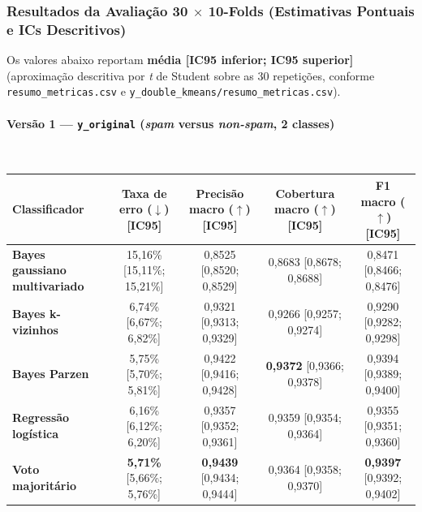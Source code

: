 \documentclass[a4paper,11pt]{article}
\begin{document}
\subsubsection{\texorpdfstring{Resultados da Avaliação 30 $\times$ 10-Folds (Estimativas Pontuais e ICs Descritivos)}{Resultados da Avaliação 30 x 10-Folds (Estimativas Pontuais e ICs Descritivos)}}\label{sec:2-3-3-resultados-da-avaliacao-30-10-folds-estimativas-pontuais-e-ics-descritivos}


Os valores abaixo reportam \textbf{média [IC95 inferior; IC95 superior]} (aproximação descritiva por \textit{t} de Student sobre as $30$ repetições, conforme \texttt{resumo\_\allowbreak metricas.csv} e \texttt{y\_\allowbreak double\_\allowbreak kmeans/\allowbreak resumo\_\allowbreak metricas.csv}).

\paragraph{\texorpdfstring{Versão 1 --- \texttt{y\_original} (\textit{spam} versus \textit{non-spam}, 2 classes)}{Versão 1 - yoriginal (spam versus non-spam, 2 classes)}}\mbox{}\\[-0.2em]\label{sec:versao-1-yoriginal-spam-versus-non-spam-2-classes}


\begin{center}
\begin{minipage}{\linewidth}
\centering
{}
\footnotesize
\sloppy
\setlength{\tabcolsep}{2.5pt}
\renewcommand{\arraystretch}{1.18}
\begin{tabularx}{\linewidth}{P{2.55cm} C C C C}
\toprule
\textbf{Classificador} & \textbf{Taxa de erro ($\downarrow$) [IC95]} & \textbf{Precisão macro ($\uparrow$) [IC95]} & \textbf{Cobertura macro ($\uparrow$) [IC95]} & \textbf{F1 macro ($\uparrow$) [IC95]} \\
\midrule
\textbf{Bayes gaussiano multivariado} & 15,16\% [15,11\%; 15,21\%] & 0,8525 [0,8520; 0,8529] & 0,8683 [0,8678; 0,8688] & 0,8471 [0,8466; 0,8476] \\
\textbf{Bayes k-vizinhos} & 6,74\% [6,67\%; 6,82\%] & 0,9321 [0,9313; 0,9329] & 0,9266 [0,9257; 0,9274] & 0,9290 [0,9282; 0,9298] \\
\textbf{Bayes Parzen} & 5,75\% [5,70\%; 5,81\%] & 0,9422 [0,9416; 0,9428] & \textbf{0,9372} [0,9366; 0,9378] & 0,9394 [0,9389; 0,9400] \\
\textbf{Regressão logística} & 6,16\% [6,12\%; 6,20\%] & 0,9357 [0,9352; 0,9361] & 0,9359 [0,9354; 0,9364] & 0,9355 [0,9351; 0,9360] \\
\textbf{Voto majoritário} & \textbf{5,71\%} [5,66\%; 5,76\%] & \textbf{0,9439} [0,9434; 0,9444] & 0,9364 [0,9358; 0,9370] & \textbf{0,9397} [0,9392; 0,9402] \\
\bottomrule
\end{tabularx}
\end{minipage}
\end{center}
\end{document}
